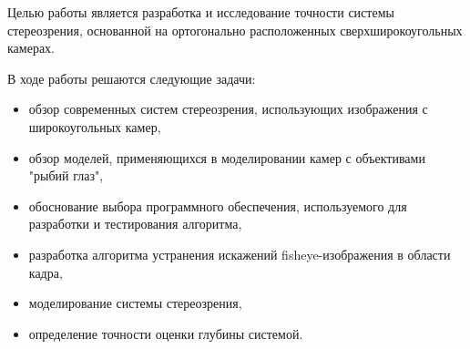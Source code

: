 Целью работы является разработка и исследование точности системы стереозрения, основанной на ортогонально расположенных сверхширокоугольных камерах.

В ходе работы решаются следующие задачи:
\begin{itemize}     %
    \item обзор современных систем стереозрения, использующих изображения с широкоугольных камер,
    \item обзор моделей, применяющихся в моделировании камер с объективами "рыбий глаз",
    \item обоснование выбора программного обеспечения, используемого для разработки и тестирования алгоритма, 
    \item разработка алгоритма устранения искажений fisheye-изображения в  области кадра, %
    \item моделирование системы  стереозрения,                                      
    \item определение точности оценки глубины системой.  
\end{itemize}


\clearpage